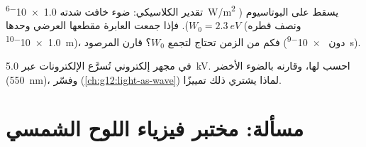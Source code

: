 \begin{exercise}[$\star\star\star$]\label{exo:g12:quantum-world:14}
تقدير  الكلاسيكي: ضوء خافت شدته \qty{1.0e-6}{W/m^2}
يسقط على البوتاسيوم ($W_0 = \qty{2.3}{eV}$). فإذا جمعت  
العابرة مقطعها العرضي وحدها (ونصف قطره \qty{1.0e-10}{m})، فكم من الزمن
تحتاج لتجمع $W_0$؟ قارن  المرصود (دون \qty{e-9}{s}).
\end{exercise}

\begin{exercise}[$\star\star\star$]\label{exo:g12:quantum-world:15}
في مجهر إلكتروني تُسرَّع الإلكترونات عبر \qty{5.0}{kV}.
احسب  لها، وقارنه بالضوء الأخضر (\qty{550}{nm})،
وفسّر  (\cref{ch:g12:light-as-wave}) لماذا يشتري ذلك تمييزًا.
\end{exercise}

\section{مسألة: مختبر فيزياء اللوح الشمسي}

